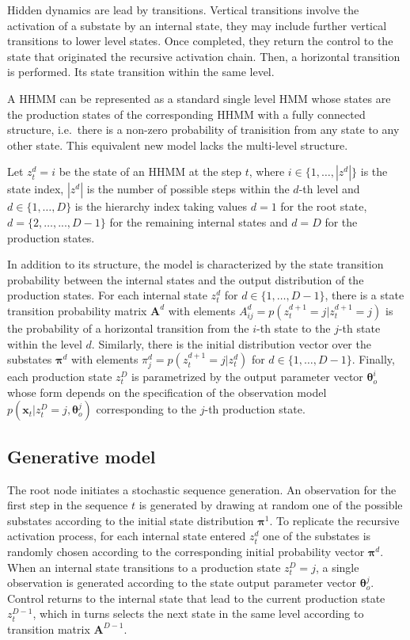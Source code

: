 \documentclass[]{article}
\newcommand{\mat}[1]{\bm{#1}}
\begin{document}
Hidden dynamics are lead by transitions. Vertical transitions involve
the activation of a substate by an internal state, they may include
further vertical transitions to lower level states. Once completed, they
return the control to the state that originated the recursive activation
chain. Then, a horizontal transition is performed. Its state transition
within the same level.

A HHMM can be represented as a standard single level HMM whose states
are the production states of the corresponding HHMM with a fully
connected structure, i.e.~there is a non-zero probability of tranisition
from any state to any other state. This equivalent new model lacks the
multi-level structure.

Let \(z_{t}^{d} = i\) be the state of an HHMM at the step \(t\), where
\(i \in \{1, \dots, |z^{d}|\}\) is the state index, \(|z^{d}|\) is the
number of possible steps within the \(d\)-th level and
\(d \in \{1, \dots, D\}\) is the hierarchy index taking values \(d = 1\)
for the root state, \(d = \{2, \dots, ..., D-1\}\) for the remaining
internal states and \(d = D\) for the production states.

In addition to its structure, the model is characterized by the state
transition probability between the internal states and the output
distribution of the production states. For each internal state \(z_t^d\)
for \(d \in \{1, \dots, D - 1\}\), there is a state transition
probability matrix \(\mat{A}^d\) with elements
\(A_{ij}^{d} = p(z_{t}^{d+1} = j | z_{t}^{d+1} = j)\) is the probability
of a horizontal transition from the \(i\)-th state to the \(j\)-th state
within the level \(d\). Similarly, there is the initial distribution
vector over the substates \(\mat{\pi}^d\) with elements
\(\pi_j^d = p(z_t^{d+1} = j | z_t^d)\) for
\(d \in \{1, \dots, D - 1\}\). Finally, each production state \(z_t^D\)
is parametrized by the output parameter vector \(\mat{\theta}_o^i\)
whose form depends on the specification of the observation model
\(p(\mat{x}_t | z_t^D = j, \mat{\theta}_o^j)\) corresponding to the
\(j\)-th production state.

\subsection{Generative model}\label{generative-model}

The root node initiates a stochastic sequence generation. An observation
for the first step in the sequence \(t\) is generated by drawing at
random one of the possible substates according to the initial state
distribution \(\mat{\pi}^1\). To replicate the recursive activation
process, for each internal state entered \(z_t^d\) one of the substates
is randomly chosen according to the corresponding initial probability
vector \(\mat{\pi}^d\). When an internal state transitions to a
production state \(z_t^D = j\), a single observation is generated
according to the state output parameter vector \(\mat{\theta}_o^j\).
Control returns to the internal state that lead to the current
production state \(z_t^{D-1}\), which in turns selects the next state in
the same level according to transition matrix \(\mat{A}^{D-1}\).
\end{document}
